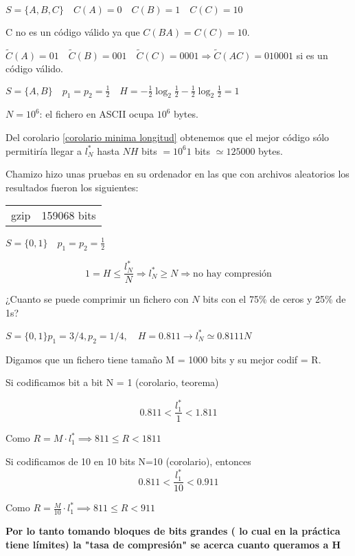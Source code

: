 	\begin{example}

		$S = \{A,B,C\} \quad C(A) = 0 \quad C(B) = 1 \quad C(C) = 10$

		C no es un código válido ya que $C(BA) = C(C) = 10$.

		$\widetilde{C}(A) = 01 \quad \widetilde{C}(B) = 001 \quad \widetilde{C}(C) = 0001 \Rightarrow \widetilde{C}(AC) = 010001 $ si es un código válido.

	\end{example}


	\begin{example}


		$S = \{A,B\} \quad p_1 = p_2 = \frac{1}{2} \quad H = -\frac{1}{2} \log_2 \frac{1}{2} - \frac{1}{2} \log_2 \frac{1}{2} = 1$

		$N = 10^6$: el fichero en ASCII ocupa $10^6$ bytes.

		Del corolario \ref{corolario minima longitud} obtenemos que el mejor código sólo permitiría llegar a $l^*_N$ hasta $NH$ bits $= 10^6 1$ bits $\simeq 125000$ bytes.

		Chamizo hizo unas pruebas en su ordenador en las que con archivos aleatorios los resultados fueron los siguientes:

		\begin{table}[h]
			\begin{tabular}{r|c}
			gzip & 159068 bits
			\end{tabular}
		\end{table}


	\end{example}


	\begin{example}

		$S = \{0,1\} \quad p_1 = p_2 = \frac{1}{2}$

		$$ 1 = H \leq \frac{l^*_N}{N} \Rightarrow l^*_N \geq N \Rightarrow \text{no hay compresión} $$

	\end{example}

\begin{example}
 ¿Cuanto se puede comprimir un fichero con $N$ bits con el 75\% de ceros y 25\% de 1s? 
	
	$ S= \{0,1\} p_1 = 3/4, p_2 = 1/4, \quad H = 0.811 \rightarrow  l^*_N \simeq 0.8111 N $
	
	Digamos que un fichero tiene tamaño M = 1000 bits y su mejor codif = R.
	
	Si codificamos bit a bit N = 1 (corolario, teorema)
	
	$$0.811 < \frac{l^{*}_1}{1} < 1.811$$
	
	Como $R = M \cdot l^{*}_1 \implies 811 \leq R < 1811$
	
	Si codificamos de 10 en 10 bits N=10 (corolario), entonces
	$$0.811 < \frac{l^{*}_1}{10} < 0.911$$
	
	Como $R = \frac{M}{10} \cdot l^{*}_1 \implies 811 \leq R < 911$
	
	\textbf{Por lo tanto tomando bloques de bits grandes ( lo cual en la práctica tiene límites) la "tasa de compresión" se acerca cuanto queramos a H} 
\end{example}
	

